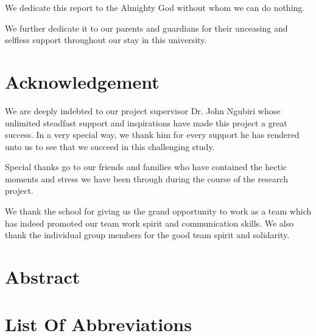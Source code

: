 \documentclass[12pt, a4paper]{report}
\begin{document}
We dedicate this report to the Almighty God without whom we can do nothing.

We further dedicate it to our parents and guardians for their unceasing and selfless support throughout our stay in this university.

\newpage


\chapter*{Acknowledgement}

We are deeply indebted to our project supervisor Dr. John Ngubiri whose unlimited steadfast support and inspirations have made this project a great success. In a very special way, we thank him for every support he has rendered unto us to see that we succeed in this challenging study.

Special thanks go to our friends and families who have contained the hectic moments and stress we have been through during the course of the research project.

We thank the school for giving us the grand opportunity to work as a team which has indeed promoted our team work spirit and communication skills. We also thank the individual group members for the good team spirit and solidarity.

\newpage


\chapter*{Abstract}

\newpage

 \tableofcontents

\newpage

\listoffigures

\newpage

\listoftables

\newpage


\chapter*{List Of Abbreviations}

\newpage
\end{document}
